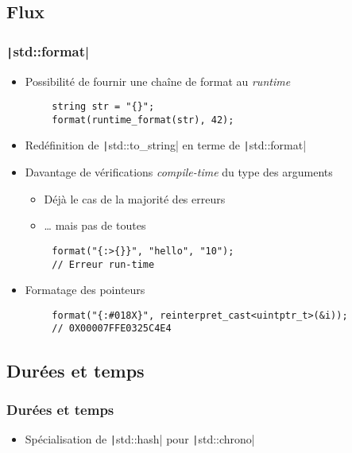 \documentclass[C++.tex]{subfiles}
\begin{document}
\subsection*{Flux}
\begin{frame}[fragile]
	\frametitle{\texttt|std::format|}
	\begin{itemize}
		\item Possibilité de fournir une chaîne de format au \textit{runtime}
	\end{itemize}

	\begin{verbatim}
		string str = "{}";
		format(runtime_format(str), 42);
	\end{verbatim}

	\begin{itemize}
		\item Redéfinition de \texttt|std::to_string| en terme de \texttt|std::format|
		\item Davantage de vérifications \textit{compile-time} du type des arguments
		\begin{itemize}
			\item Déjà le cas de la majorité des erreurs
			\item \ldots{} mais pas de toutes
		\end{itemize}
	\end{itemize}

	\begin{verbatim}
		format("{:>{}}", "hello", "10");
		// Erreur run-time
	\end{verbatim}

	\begin{itemize}
		\item Formatage des pointeurs
	\end{itemize}

	\begin{verbatim}
		format("{:#018X}", reinterpret_cast<uintptr_t>(&i));
		// 0X00007FFE0325C4E4
	\end{verbatim}

\end{frame}

\subsection*{Durées et temps}
\begin{frame}[fragile]
	\frametitle{Durées et temps}
	\begin{itemize}
		\item Spécialisation de \texttt|std::hash| pour \texttt|std::chrono|
	\end{itemize}

\end{frame}
\end{document}

